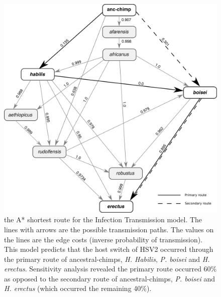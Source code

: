 \documentclass[fleqn,10pt]{wlscirep}
\begin{document}
\begin{figure}
  \centering
  \includegraphics[width=\textwidth]{figs/dag-it}
  \caption{the A* shortest route for the Infection Transmission model. The lines with arrows are the possible transmission paths. The values on the lines are the edge costs (inverse probability of transmission). This model predicts that the host switch of HSV2 occurred through the primary route of ancestral-chimps, \textit{H. Habilis}, \textit{P. boisei} and \textit{H. erectus}. Sensitivity analysis revealed the primary route occurred 60\% as opposed to the secondary route of ancestral-chimps, \textit{P. boisei} and \textit{H. erectus} (which occurred the remaining 40\%).}
  \label{fig:dag-it}   
\end{figure}     
\end{document}
